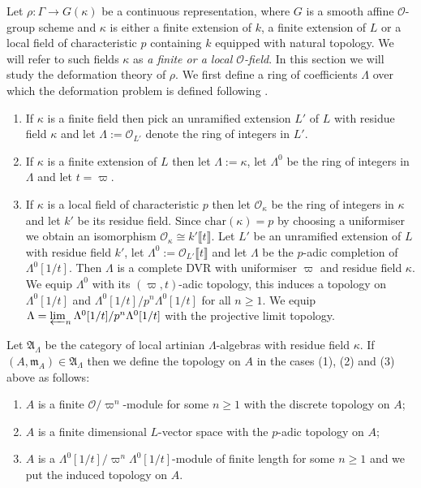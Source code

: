 \documentclass{amsart}
\theoremstyle{definition}
\theoremstyle{remark}
\newcommand{\mm}{\mathfrak m}
\newcommand{\OO}{\mathcal O}
\newcommand{\br}[1]{\llbracket #1\rrbracket}
\newcommand{\cha}{\mathrm{char}}
\begin{document}
Let $\rho: \Gamma\rightarrow G(\kappa)$ be a continuous 
representation, where $G$ is a smooth affine $\OO$-group scheme and
$\kappa$ is either a finite extension of $k$, a finite extension of $L$ 
or a local field of characteristic $p$ containing $k$ equipped with natural topology. We will refer to such fields $\kappa$
as \emph{a finite or a local $\OO$-field}. 
In this section we will study  the deformation theory of $\rho$.
We first define a ring of coefficients $\Lambda$ 
over which the deformation problem is defined
following \cite[Section 3.5]{BIP_new}.
\begin{enumerate}
    \item If $\kappa$ is a finite field then pick an unramified extension $L'$ of $L$ with residue field $\kappa$ and let $\Lambda := \OO_{L'}$ denote the ring of integers in $L'$.
    \item If $\kappa$ is a finite extension of $L$ then let $\Lambda:=\kappa$, let $\Lambda^0$ 
be the ring of integers in $\Lambda$ and let $t=\varpi$.
    \item If $\kappa$ is a local field of characteristic $p$ then let $\OO_{\kappa}$ be the ring of integers 
in $\kappa$ and let $k'$ be its residue field. Since $\cha(\kappa)=p$ by choosing a uniformiser we obtain an isomorphism $\OO_{\kappa}\cong k'\br{t}$. Let $L'$ be an unramified extension of $L$ with residue field $k'$,
let $\Lambda^0:= \OO_{L'} \br{t}$ and let $\Lambda$ 
be the $p$-adic completion of $\Lambda^0[1/t]$. Then 
$\Lambda$ is a complete DVR with uniformiser $\varpi$
and residue field $\kappa$. We equip $\Lambda^0$ 
with its $(\varpi, t)$-adic topology, this induces 
a topology on $\Lambda^0[1/t]$ and 
$\Lambda^0[1/t]/ p^n \Lambda^0[1/t]$ for all $n\ge 1$. We equip $\Lambda= \varprojlim_{n} \Lambda^0[1/t]/ p^n \Lambda^0[1/t]$ with the projective limit topology. 
\end{enumerate}



Let $\mathfrak A_{\Lambda}$ be the category of local
artinian $\Lambda$-algebras with residue field $\kappa$. 
If $(A, \mm_A)\in \mathfrak A_{\Lambda}$ then we define the topology on $A$ in the cases (1), (2) and (3) above as follows:
\begin{enumerate}
    \item $A$ is a finite $\OO/\varpi^n$-module for some $n\ge 1$ with  the discrete topology on $A$;
    \item 
$A$ is a finite dimensional $L$-vector space with the $p$-adic topology on $A$; 
    \item 
$A$ is a $\Lambda^0[1/t]/ \varpi^n \Lambda^0[1/t]$-module of finite length for some $n\ge 1$ and we
put the induced topology on $A$.
\end{enumerate}
\end{document}
